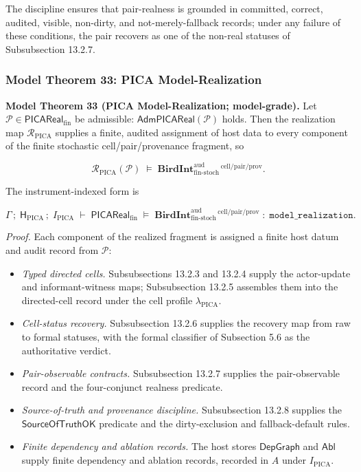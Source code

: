 \documentclass[11pt]{article}
\providecommand{\tightlist}{}
\theoremstyle{definition}
\begin{document}
The discipline ensures that pair-realness is grounded in committed, correct, audited, visible, non-dirty, and not-merely-fallback records; under any failure of these conditions, the pair recovers as one of the non-real statuses of Subsubsection 13.2.7.

\subsubsection{Model Theorem 33: PICA Model-Realization}

\textbf{Model Theorem 33 (PICA Model-Realization; model-grade).} Let \(\mathcal P\in\mathsf{PICAReal}_{\mathrm{fin}}\) be admissible: \(\mathsf{AdmPICAReal}(\mathcal P)\) holds. Then the realization map \(\mathcal R_{\mathrm{PICA}}\) supplies a finite, audited assignment of host data to every component of the finite stochastic cell/pair/provenance fragment, so

\[
\mathcal R_{\mathrm{PICA}}(\mathcal P)\;\models\;\mathbf{BirdInt}^{\mathrm{aud}}_{\mathrm{fin\text{-}stoch}}{}^{\,\mathrm{cell}/\mathrm{pair}/\mathrm{prov}}.
\]

The instrument-indexed form is

\[
\Gamma\,;\;\mathsf H_{\mathrm{PICA}}\,;\;I_{\mathrm{PICA}}\;\vdash\;\mathsf{PICAReal}_{\mathrm{fin}}\;\models\;\mathbf{BirdInt}^{\mathrm{aud}}_{\mathrm{fin\text{-}stoch}}{}^{\,\mathrm{cell}/\mathrm{pair}/\mathrm{prov}}\;:\;\texttt{model\_realization}.
\]

\emph{Proof.} Each component of the realized fragment is assigned a finite host datum and audit record from \(\mathcal P\):

\begin{itemize}
\tightlist
\item
  \emph{Typed directed cells.} Subsubsections 13.2.3 and 13.2.4 supply the actor-update and informant-witness maps; Subsubsection 13.2.5 assembles them into the directed-cell record under the cell profile \(\lambda_{\mathrm{PICA}}\).
\item
  \emph{Cell-status recovery.} Subsubsection 13.2.6 supplies the recovery map from raw to formal statuses, with the formal classifier of Subsection 5.6 as the authoritative verdict.
\item
  \emph{Pair-observable contracts.} Subsubsection 13.2.7 supplies the pair-observable record and the four-conjunct realness predicate.
\item
  \emph{Source-of-truth and provenance discipline.} Subsubsection 13.2.8 supplies the \(\mathsf{SourceOfTruthOK}\) predicate and the dirty-exclusion and fallback-default rules.
\item
  \emph{Finite dependency and ablation records.} The host stores \(\mathsf{DepGraph}\) and \(\mathsf{Abl}\) supply finite dependency and ablation records, recorded in \(A\) under \(I_{\mathrm{PICA}}\).
\end{itemize}
\end{document}
